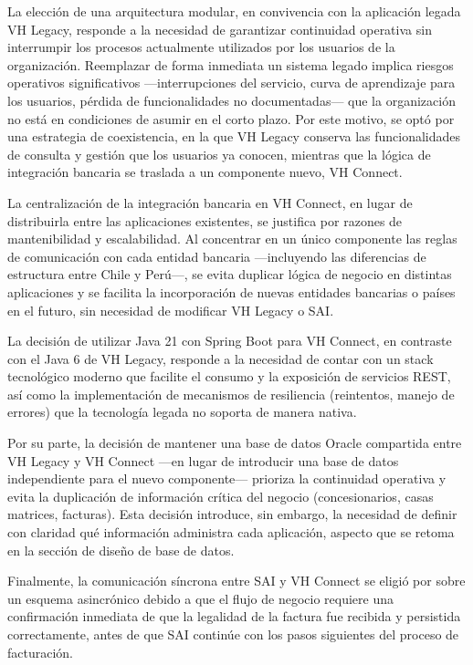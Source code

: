 La elección de una arquitectura modular, en convivencia con la aplicación legada VH Legacy, responde a la necesidad de garantizar continuidad operativa sin interrumpir los procesos actualmente utilizados por los usuarios de la organización. Reemplazar de forma inmediata un sistema legado implica riesgos operativos significativos ---interrupciones del servicio, curva de aprendizaje para los usuarios, pérdida de funcionalidades no documentadas--- que la organización no está en condiciones de asumir en el corto plazo. Por este motivo, se optó por una estrategia de coexistencia, en la que VH Legacy conserva las funcionalidades de consulta y gestión que los usuarios ya conocen, mientras que la lógica de integración bancaria se traslada a un componente nuevo, VH Connect.

La centralización de la integración bancaria en VH Connect, en lugar de distribuirla entre las aplicaciones existentes, se justifica por razones de mantenibilidad y escalabilidad. Al concentrar en un único componente las reglas de comunicación con cada entidad bancaria ---incluyendo las diferencias de estructura entre Chile y Perú---, se evita duplicar lógica de negocio en distintas aplicaciones y se facilita la incorporación de nuevas entidades bancarias o países en el futuro, sin necesidad de modificar VH Legacy o SAI.

La decisión de utilizar Java 21 con Spring Boot para VH Connect, en contraste con el Java 6 de VH Legacy, responde a la necesidad de contar con un stack tecnológico moderno que facilite el consumo y la exposición de servicios REST, así como la implementación de mecanismos de resiliencia (reintentos, manejo de errores) que la tecnología legada no soporta de manera nativa.

Por su parte, la decisión de mantener una base de datos Oracle compartida entre VH Legacy y VH Connect ---en lugar de introducir una base de datos independiente para el nuevo componente--- prioriza la continuidad operativa y evita la duplicación de información crítica del negocio (concesionarios, casas matrices, facturas). Esta decisión introduce, sin embargo, la necesidad de definir con claridad qué información administra cada aplicación, aspecto que se retoma en la sección de diseño de base de datos.

Finalmente, la comunicación síncrona entre SAI y VH Connect se eligió por sobre un esquema asincrónico debido a que el flujo de negocio requiere una confirmación inmediata de que la legalidad de la factura fue recibida y persistida correctamente, antes de que SAI continúe con los pasos siguientes del proceso de facturación.

